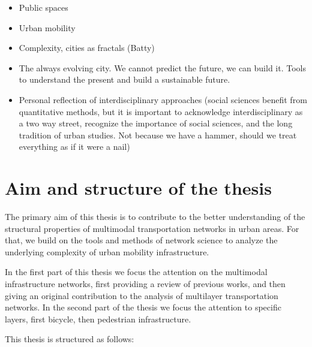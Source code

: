\begin{itemize}
    \item Public spaces
    \item Urban mobility
    \item Complexity, cities as fractals (Batty)
    \item The always evolving city. We cannot predict the future, we can build it. Tools to understand the present and build a sustainable future.
    \item Personal reflection of interdisciplinary approaches (social sciences benefit from quantitative methods, but it is important to acknowledge interdisciplinary as a two way street, recognize the importance of social sciences, and the long tradition of urban studies. Not because we have a hammer, should we treat everything as if it were a nail) 
\end{itemize}


\section{Aim and structure of the thesis}


The primary aim of this thesis is to contribute to the better understanding of the structural properties of multimodal transportation networks in urban areas. For that, we build on the tools and methods of network science to analyze the underlying complexity of urban mobility infrastructure. 

In the first part of this thesis we focus the attention on the multimodal infrastructure networks, first providing a review of previous works, and then giving an original contribution to the analysis of multilayer transportation networks. In the second part of the thesis we focus the attention to specific layers, first bicycle, then pedestrian infrastructure.

This thesis is structured as follows:

